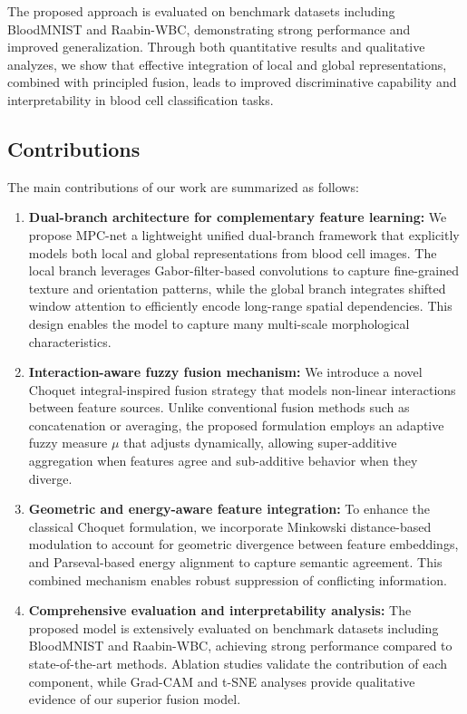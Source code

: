 \documentclass[12pt]{article}
\begin{document}
The proposed approach is evaluated on benchmark datasets including BloodMNIST and Raabin-WBC, demonstrating strong performance and improved generalization. Through both quantitative results and qualitative analyzes, we show that effective integration of local and global representations, combined with principled fusion, leads to improved discriminative capability and interpretability in blood cell classification tasks.
\subsection{Contributions}

The main contributions of our work are summarized as follows:

\begin{enumerate}

\item \textbf{Dual-branch architecture for complementary feature learning:}  
We propose MPC-net a lightweight unified dual-branch framework that explicitly models both local and global representations from blood cell images. The local branch leverages Gabor-filter-based convolutions to capture fine-grained texture and orientation patterns, while the global branch integrates shifted window attention to efficiently encode long-range spatial dependencies. This design enables the model to capture many multi-scale morphological characteristics.

\item \textbf{Interaction-aware fuzzy fusion mechanism:}  
We introduce a novel Choquet integral-inspired fusion strategy that models non-linear interactions between feature sources. Unlike conventional fusion methods such as concatenation or averaging, the proposed formulation employs an adaptive fuzzy measure $\mu$ that adjusts dynamically, allowing super-additive aggregation when features agree and sub-additive behavior when they diverge.

\item \textbf{Geometric and energy-aware feature integration:}  
To enhance the classical Choquet formulation, we incorporate Minkowski distance-based modulation to account for geometric divergence between feature embeddings, and Parseval-based energy alignment to capture semantic agreement. This combined mechanism enables robust suppression of conflicting information.

\item \textbf{Comprehensive evaluation and interpretability analysis:}  
The proposed model is extensively evaluated on benchmark datasets including BloodMNIST and Raabin-WBC, achieving strong performance compared to state-of-the-art methods. Ablation studies validate the contribution of each component, while Grad-CAM and t-SNE analyses provide qualitative evidence of our superior fusion model.

\end{enumerate}
\end{document}
